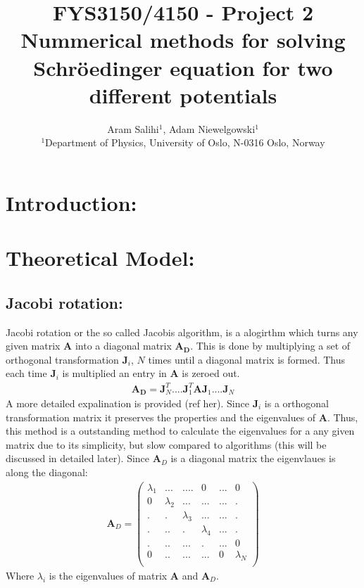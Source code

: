 \documentclass[a4paper, 10pt]{article}
\title{FYS3150/4150 - Project 2 \\
  Nummerical methods for solving Schröedinger equation for two different potentials}
\author{Aram Salihi$^1$, Adam Niewelgowski$^1$ \\
  \small $^1$Department of Physics, University of Oslo, N-0316 Oslo, Norway}
\begin{document}
\maketitle
\begin{abstract}

\end{abstract}
\tableofcontents
\section{Introduction:}
\section{Theoretical Model:}
\subsection{Jacobi rotation:} Jacobi rotation or the so called Jacobis algorithm,
is a alogirthm which turns any given matrix $\mathbf{A}$ into a diagonal matrix $\mathbf{A_{D}}$.
This is done by multiplying a set of orthogonal transformation $\mathbf{J}_{i}$, $N$ times until
a diagonal matrix is formed. Thus each time $\mathbf{J}_{i}$ is multiplied an entry in
$\mathbf{A}$ is zeroed out.
\begin{align}
  \mathbf{A_{D}} = \mathbf{J}^{T}_{N}....\mathbf{J}^{T}_{1}\mathbf{A}
  \mathbf{J}_{1}....\mathbf{J}_{N}
\end{align}
A more detailed expalination is provided (ref her).
Since $\mathbf{J}_{i}$ is a orthogonal transformation matrix it preserves the properties and
the eigenvalues of $\mathbf{A}$. Thus, this method is a outstanding method
to calculate the eigenvalues for a any given matrix due to its simplicity, but slow
compared to algorithms (this will be discussed in detailed later). Since $\mathbf{A}_{D}$
is a diagonal matrix the eigenvlaues is along the diagonal:
\begin{align}
\mathbf{A}_{D} =
\begin{pmatrix}
\lambda_{1} & ... & .... & 0 & ... & 0\\
0 & \lambda_{2} & ... & ... &... &. \\
. & . &\lambda_{3} & ... & ... & . \\
. & .. & . & \lambda_{4} & ... & . \\
. & ..  & ... & . &... & 0 \\
0 & .. & ... & ... & 0 & \lambda_{N} \\
\end{pmatrix}
\end{align}
Where $\lambda_{i}$ is the eigenvalues of matrix $\mathbf{A}$ and $\mathbf{A}_{D}$.
\end{document}
